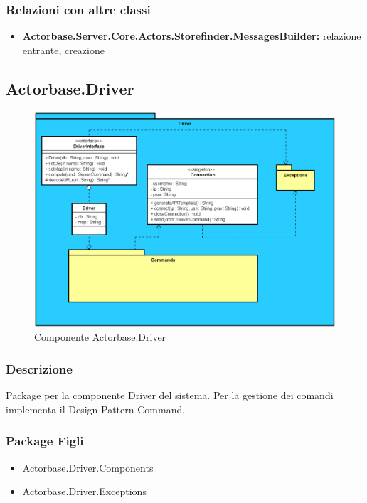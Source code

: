 \documentclass[a4paper]{article}
\begin{document}
			\subsubsection{Relazioni con altre classi}
			\begin{itemize}
				\item \textbf{Actorbase.Server.Core.Actors.Storefinder.MessagesBuilder:} relazione entrante, creazione
			\end{itemize}
			
			
					\subsection{Actorbase.Driver}
		\begin{figure} [H]
			\centering
			\includegraphics[scale=0.5]{ST/Client/DriverSemplificato.png}
        	\caption{Componente Actorbase.Driver}
		\end{figure}
		
		\subsubsection{Descrizione}
			Package per la componente Driver del sistema. Per la gestione dei comandi implementa il Design Pattern Command.
			
		\subsubsection{Package Figli}
			\begin{itemize}
				\item Actorbase.Driver.Components
				\item Actorbase.Driver.Exceptions
			\end{itemize}
			
\end{document}
